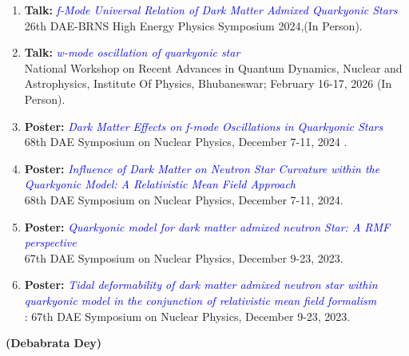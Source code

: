 \begin{enumerate}

\item {\bf Talk:} \textcolor{blue}{\textit{f-Mode Universal Relation of Dark Matter Admixed Quarkyonic Stars}}\\
 26th DAE-BRNS High Energy Physics Symposium 2024,(In Person).
\vspace{0.5cm}	
\item {\bf Talk:} \textcolor{blue}{\it w-mode oscillation of quarkyonic star}\\
National Workshop on Recent Advances in Quantum Dynamics, Nuclear and Astrophysics, Institute Of Physics, Bhubaneswar; February 16-17, 2026 (In Person).
\vspace{0.5cm}
\item {\bf Poster:} \textcolor{blue}{\textit{Dark Matter Effects on f-mode Oscillations in Quarkyonic Stars}}\\
 68th DAE Symposium on Nuclear Physics, December 7-11, 2024 .
\vspace{0.5cm}	
\item {\bf Poster:} \textcolor{blue}{\textit{Influence of Dark Matter on Neutron Star Curvature within the Quarkyonic Model: A Relativistic Mean Field Approach}}\\
 68th DAE Symposium on Nuclear Physics, December 7-11, 2024.
\vspace{0.5cm}	
\item {\bf Poster:} \textcolor{blue}{\textit{Quarkyonic model for dark matter admixed neutron Star: A RMF perspective}}\\
67th DAE Symposium on Nuclear Physics, December 9-23, 2023.

\vspace{0.5cm}
\item {\bf Poster:} \textcolor{blue}{\textit{Tidal deformability of dark matter admixed neutron star within quarkyonic model in the conjunction of relativistic mean field formalism}}\\
: 67th DAE Symposium on Nuclear Physics, December 9-23, 2023.
\vspace{0.5cm}



\end{enumerate}
\vspace{0.5cm}
\begin{flushright}
	\textbf{(Debabrata Dey)}
\end{flushright}
